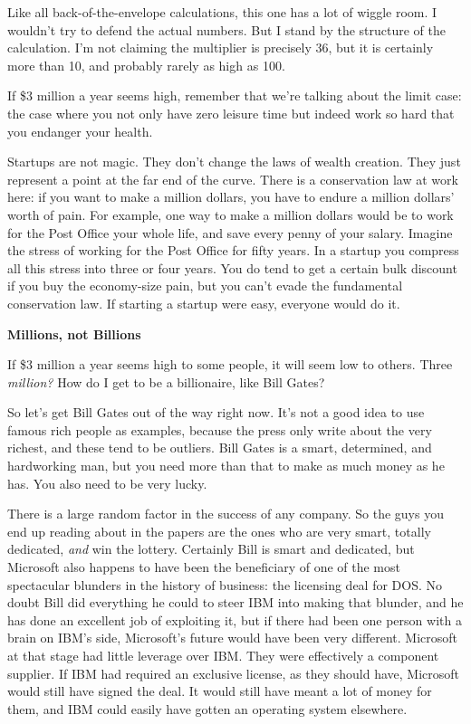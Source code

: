 \documentclass[12pt]{book}
\begin{document}
Like all back-of-the-envelope calculations, this one has a lot of wiggle
room. I wouldn't try to defend the actual numbers. But I stand by the
structure of the calculation. I'm not claiming the multiplier is
precisely 36, but it is certainly more than 10, and probably rarely as
high as 100.

If \$3 million a year seems high, remember that we're talking about the
limit case: the case where you not only have zero leisure time but
indeed work so hard that you endanger your health.

Startups are not magic. They don't change the laws of wealth creation.
They just represent a point at the far end of the curve. There is a
conservation law at work here: if you want to make a million dollars,
you have to endure a million dollars' worth of pain. For example, one
way to make a million dollars would be to work for the Post Office your
whole life, and save every penny of your salary. Imagine the stress of
working for the Post Office for fifty years. In a startup you compress
all this stress into three or four years. You do tend to get a certain
bulk discount if you buy the economy-size pain, but you can't evade the
fundamental conservation law. If starting a startup were easy, everyone
would do it.

\textbf{Millions, not Billions}

If \$3 million a year seems high to some people, it will seem low to
others. Three \emph{million?} How do I get to be a billionaire, like
Bill Gates?

So let's get Bill Gates out of the way right now. It's not a good idea
to use famous rich people as examples, because the press only write
about the very richest, and these tend to be outliers. Bill Gates is a
smart, determined, and hardworking man, but you need more than that to
make as much money as he has. You also need to be very lucky.

There is a large random factor in the success of any company. So the
guys you end up reading about in the papers are the ones who are very
smart, totally dedicated, \emph{and} win the lottery. Certainly Bill is
smart and dedicated, but Microsoft also happens to have been the
beneficiary of one of the most spectacular blunders in the history of
business: the licensing deal for DOS. No doubt Bill did everything he
could to steer IBM into making that blunder, and he has done an
excellent job of exploiting it, but if there had been one person with a
brain on IBM's side, Microsoft's future would have been very different.
Microsoft at that stage had little leverage over IBM. They were
effectively a component supplier. If IBM had required an exclusive
license, as they should have, Microsoft would still have signed the
deal. It would still have meant a lot of money for them, and IBM could
easily have gotten an operating system elsewhere.
\end{document}
